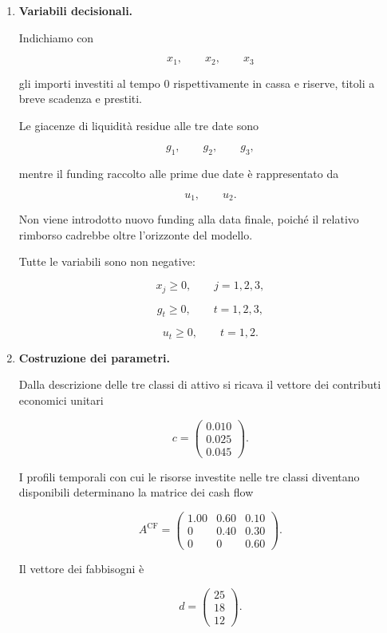\begin{enumerate}

\item \textbf{Variabili decisionali.}

Indichiamo con

\[
x_1,\qquad x_2,\qquad x_3
\]

gli importi investiti al tempo $0$ rispettivamente in cassa e riserve,
titoli a breve scadenza e prestiti.

Le giacenze di liquidit\`a residue alle tre date sono

\[
g_1,\qquad g_2,\qquad g_3,
\]

mentre il funding raccolto alle prime due date \`e rappresentato da

\[
u_1,\qquad u_2.
\]

Non viene introdotto nuovo funding alla data finale, poich\'e il relativo
rimborso cadrebbe oltre l'orizzonte del modello.

Tutte le variabili sono non negative:

\[
x_j\geq0,
\qquad
j=1,2,3,
\]

\[
g_t\geq0,
\qquad
t=1,2,3,
\]

\[
u_t\geq0,
\qquad
t=1,2.
\]


\item \textbf{Costruzione dei parametri.}

Dalla descrizione delle tre classi di attivo si ricava il vettore dei
contributi economici unitari

\[
c
=
\begin{pmatrix}
0.010\\
0.025\\
0.045
\end{pmatrix}.
\]

I profili temporali con cui le risorse investite nelle tre classi diventano
disponibili determinano la matrice dei cash flow

\[
A^{\mathrm{CF}}
=
\begin{pmatrix}
1.00 & 0.60 & 0.10\\
0    & 0.40 & 0.30\\
0    & 0    & 0.60
\end{pmatrix}.
\]

Il vettore dei fabbisogni \`e

\[
d
=
\begin{pmatrix}
25\\
18\\
12
\end{pmatrix}.
\]


\end{enumerate}
